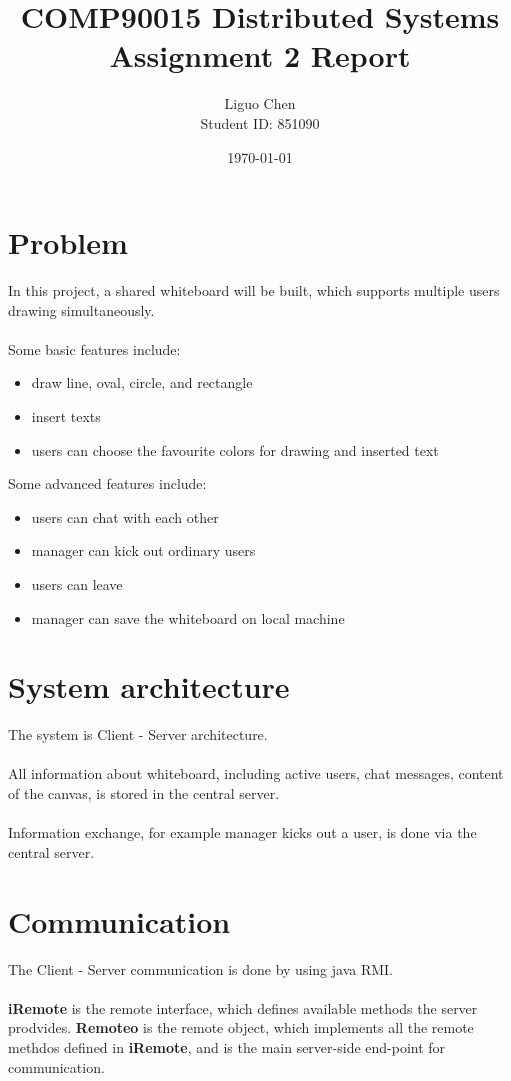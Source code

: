 \documentclass{article}
\title{COMP90015 Distributed Systems \\ 
       Assignment 2 Report}
\author{Liguo Chen\\Student ID: 851090}
\date{\today}
\begin{document}
\maketitle

\section*{Problem}
In this project, a shared whiteboard will be built, which supports multiple users drawing simultaneously.\\\\
Some basic features include:
\begin{itemize}
    \item draw line, oval, circle, and rectangle
    \item insert texts
    \item users can choose the favourite colors for drawing and inserted text
\end{itemize}
Some advanced features include:
\begin{itemize}
    \item users can chat with each other
    \item manager can kick out ordinary users
    \item users can leave
    \item manager can save the whiteboard on local machine
\end{itemize}

\section*{System architecture}
The system is Client - Server architecture.\\\\
All information about whiteboard, including active users, chat messages, content of the canvas, is stored in the central server.\\\\
Information exchange, for example manager kicks out a user, is done via the central server.

\section*{Communication}
The Client - Server communication is done by using java RMI.\\\\
\textbf{iRemote} is the remote interface, which defines available methods the server prodvides. \textbf{Remoteo} is the remote object, which implements all the remote methdos defined in \textbf{iRemote}, and is the main server-side end-point for communication.
\end{document}
